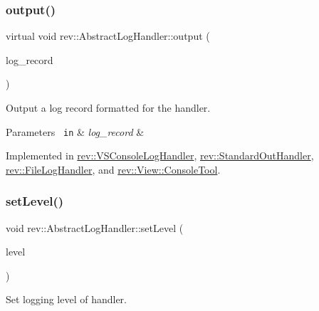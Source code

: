 \subsubsection{\texorpdfstring{output()}{output()}}
{\footnotesize\ttfamily virtual void rev\+::\+Abstract\+Log\+Handler\+::output (\begin{DoxyParamCaption}\item[{\mbox{\hyperlink{classrev_1_1_log_record}{Log\+Record}} \&}]{log\+\_\+record }\end{DoxyParamCaption})\hspace{0.3cm}{\ttfamily [pure virtual]}}



Output a log record formatted for the handler. 


\begin{DoxyParams}[1]{Parameters}
\mbox{\texttt{ in}}  & {\em log\+\_\+record} & \\
\hline
\end{DoxyParams}


Implemented in \mbox{\hyperlink{classrev_1_1_v_s_console_log_handler_abfe9a50069f8bb12d43a00c7e5f541e8}{rev\+::\+V\+S\+Console\+Log\+Handler}}, \mbox{\hyperlink{classrev_1_1_standard_out_handler_abba7f654fa04807e85cdb9afd0f2234e}{rev\+::\+Standard\+Out\+Handler}}, \mbox{\hyperlink{classrev_1_1_file_log_handler_ae562434aed64d166aaa1d8660984a3be}{rev\+::\+File\+Log\+Handler}}, and \mbox{\hyperlink{classrev_1_1_view_1_1_console_tool_ac8f85a1067d6aa26f66a89e475d1f24a}{rev\+::\+View\+::\+Console\+Tool}}.

\mbox{\label{classrev_1_1_abstract_log_handler_ac5451e353683fa94643feb28f73a106d}} 
\subsubsection{\texorpdfstring{setLevel()}{setLevel()}}
{\footnotesize\ttfamily void rev\+::\+Abstract\+Log\+Handler\+::set\+Level (\begin{DoxyParamCaption}\item[{Log\+Level}]{level }\end{DoxyParamCaption})\hspace{0.3cm}{\ttfamily [inline]}}



Set logging level of handler. 


